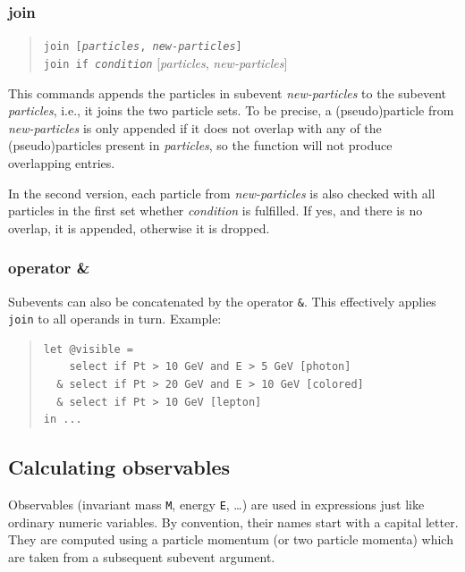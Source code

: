 \documentclass[12pt]{book}
\newcommand{\ttt}[1]{\texttt{#1}}
\begin{document}
\subsubsection{join}
\begin{quote}
\begin{footnotesize}
  \ttt{join [\textit{particles}, \textit{new-particles}]} \\
  \ttt{join if \textit{condition}} [\textit{particles}, \textit{new-particles}]
\end{footnotesize}
\end{quote}
This commands appends the particles in subevent \textit{new-particles} to the
subevent \textit{particles}, i.e., it joins the two particle sets.  To be
precise, a (pseudo)particle from \textit{new-particles} is only appended if it
does not overlap with any of the (pseudo)particles
present in \textit{particles}, so the function will not produce overlapping
entries.

In the second version, each particle from \textit{new-particles} is also
checked with all particles in the first set whether \textit{condition} is
fulfilled.  If yes, and there is no overlap, it is appended, otherwise
it is dropped.


\subsubsection{operator \&}

Subevents can also be concatenated by the operator \verb|&|.  This effectively
applies \ttt{join} to all operands in turn.  Example:
\begin{quote}
\begin{footnotesize}
\begin{verbatim}
let @visible = 
    select if Pt > 10 GeV and E > 5 GeV [photon]
  & select if Pt > 20 GeV and E > 10 GeV [colored]
  & select if Pt > 10 GeV [lepton]
in ...
\end{verbatim}
\end{footnotesize}
\end{quote}


\subsection{Calculating observables}

Observables (invariant mass \ttt{M}, energy \ttt{E}, \ldots) are used in
expressions just like ordinary numeric variables.  By convention, their names
start with a capital letter.  They are computed using a particle momentum (or
two particle momenta) which are taken from a subsequent subevent argument.
\end{document}
